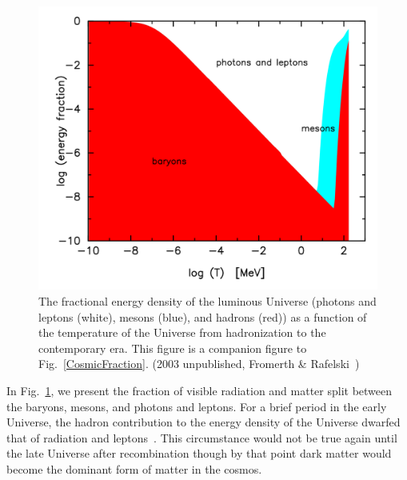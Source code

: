 \documentclass[universe,article,submit,moreauthors,pdftex,a4paper]{Definitions/mdpi}
\newcommand*{\rf}[1]{Fig.~{\ref{#1}}}
\begin{document}
\begin{figure}[ht]
\centering
\includegraphics[width=\textwidth]{./plots/hadron_content.png}
\caption{The fractional energy density of the luminous Universe (photons and leptons (white), mesons (blue), and hadrons (red)) as a function of the temperature of the Universe from hadronization to the contemporary era. This figure is a companion figure to \rf{CosmicFraction}. (2003 unpublished, Fromerth \& Rafelski~\cite{Rafelski:2019twp})}
\label{hadron_content}
\end{figure}

In \rf{hadron_content}, we present the fraction of visible radiation and matter split between the baryons, mesons, and photons and leptons. For a brief period in the early Universe, the hadron contribution to the energy density of the Universe dwarfed that of radiation and leptons~\cite{Rafelski:2019twp}. This circumstance would not be true again until the late Universe after recombination though by that point dark matter would become the dominant form of matter in the cosmos.
\end{document}
